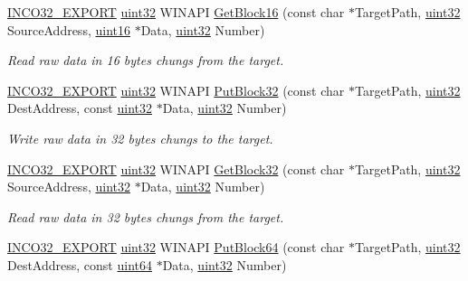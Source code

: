 \begin{DoxyCompactItemize}
\hyperlink{inco__32_8h_a09505cad5bbb66fc36750a4fbca0444b}{I\+N\+C\+O32\+\_\+\+E\+X\+P\+O\+RT} \hyperlink{indeltypes_8h_a4b435a49c74bb91f284f075e63416cb6}{uint32} W\+I\+N\+A\+PI \hyperlink{group__commonfunctions_gae507b3a868c5004a2142190a48958d79}{Get\+Block16} (const char $\ast$Target\+Path, \hyperlink{indeltypes_8h_a4b435a49c74bb91f284f075e63416cb6}{uint32} Source\+Address, \hyperlink{indeltypes_8h_a05f6b0ae8f6a6e135b0e290c25fe0e4e}{uint16} $\ast$Data, \hyperlink{indeltypes_8h_a4b435a49c74bb91f284f075e63416cb6}{uint32} Number)
\begin{DoxyCompactList}\small\item\em Read raw data in 16 bytes chungs from the target. \end{DoxyCompactList}\item 
\hyperlink{inco__32_8h_a09505cad5bbb66fc36750a4fbca0444b}{I\+N\+C\+O32\+\_\+\+E\+X\+P\+O\+RT} \hyperlink{indeltypes_8h_a4b435a49c74bb91f284f075e63416cb6}{uint32} W\+I\+N\+A\+PI \hyperlink{group__commonfunctions_ga51c1743c005a868b73e6af8e96eb9d4e}{Put\+Block32} (const char $\ast$Target\+Path, \hyperlink{indeltypes_8h_a4b435a49c74bb91f284f075e63416cb6}{uint32} Dest\+Address, const \hyperlink{indeltypes_8h_a4b435a49c74bb91f284f075e63416cb6}{uint32} $\ast$Data, \hyperlink{indeltypes_8h_a4b435a49c74bb91f284f075e63416cb6}{uint32} Number)
\begin{DoxyCompactList}\small\item\em Write raw data in 32 bytes chungs to the target. \end{DoxyCompactList}\item 
\hyperlink{inco__32_8h_a09505cad5bbb66fc36750a4fbca0444b}{I\+N\+C\+O32\+\_\+\+E\+X\+P\+O\+RT} \hyperlink{indeltypes_8h_a4b435a49c74bb91f284f075e63416cb6}{uint32} W\+I\+N\+A\+PI \hyperlink{group__commonfunctions_ga25d9fc255f93000f56d0414339ac53e6}{Get\+Block32} (const char $\ast$Target\+Path, \hyperlink{indeltypes_8h_a4b435a49c74bb91f284f075e63416cb6}{uint32} Source\+Address, \hyperlink{indeltypes_8h_a4b435a49c74bb91f284f075e63416cb6}{uint32} $\ast$Data, \hyperlink{indeltypes_8h_a4b435a49c74bb91f284f075e63416cb6}{uint32} Number)
\begin{DoxyCompactList}\small\item\em Read raw data in 32 bytes chungs from the target. \end{DoxyCompactList}\item 
\hyperlink{inco__32_8h_a09505cad5bbb66fc36750a4fbca0444b}{I\+N\+C\+O32\+\_\+\+E\+X\+P\+O\+RT} \hyperlink{indeltypes_8h_a4b435a49c74bb91f284f075e63416cb6}{uint32} W\+I\+N\+A\+PI \hyperlink{group__commonfunctions_gaa67eff1b4ca61c6c9f1587bafa6e0a54}{Put\+Block64} (const char $\ast$Target\+Path, \hyperlink{indeltypes_8h_a4b435a49c74bb91f284f075e63416cb6}{uint32} Dest\+Address, const \hyperlink{indeltypes_8h_ac6afe794ed283c11fb63426a58188e5e}{uint64} $\ast$Data, \hyperlink{indeltypes_8h_a4b435a49c74bb91f284f075e63416cb6}{uint32} Number)

\end{DoxyCompactItemize}
